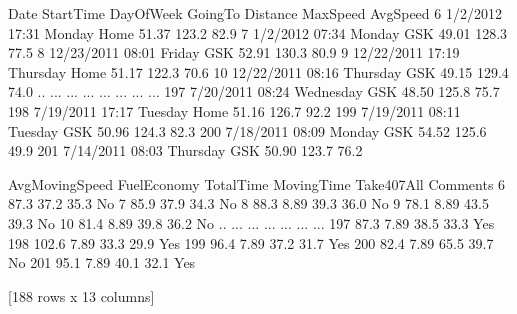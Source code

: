 \documentclass[letterpaper,10pt,english]{jupyterBook}
\begin{document}
\begin{sphinxVerbatim}[commandchars=\\\{\}]
           Date StartTime  DayOfWeek GoingTo  Distance  MaxSpeed  AvgSpeed  \PYGZbs{}
6      1/2/2012     17:31     Monday    Home     51.37     123.2      82.9   
7      1/2/2012     07:34     Monday     GSK     49.01     128.3      77.5   
8    12/23/2011     08:01     Friday     GSK     52.91     130.3      80.9   
9    12/22/2011     17:19   Thursday    Home     51.17     122.3      70.6   
10   12/22/2011     08:16   Thursday     GSK     49.15     129.4      74.0   
..          ...       ...        ...     ...       ...       ...       ...   
197   7/20/2011     08:24  Wednesday     GSK     48.50     125.8      75.7   
198   7/19/2011     17:17    Tuesday    Home     51.16     126.7      92.2   
199   7/19/2011     08:11    Tuesday     GSK     50.96     124.3      82.3   
200   7/18/2011     08:09     Monday     GSK     54.52     125.6      49.9   
201   7/14/2011     08:03   Thursday     GSK     50.90     123.7      76.2   

     AvgMovingSpeed FuelEconomy  TotalTime  MovingTime Take407All Comments  
6              87.3           \PYGZhy{}       37.2        35.3         No           
7              85.9           \PYGZhy{}       37.9        34.3         No           
8              88.3        8.89       39.3        36.0         No           
9              78.1        8.89       43.5        39.3         No           
10             81.4        8.89       39.8        36.2         No           
..              ...         ...        ...         ...        ...      ...  
197            87.3        7.89       38.5        33.3        Yes           
198           102.6        7.89       33.3        29.9        Yes           
199            96.4        7.89       37.2        31.7        Yes           
200            82.4        7.89       65.5        39.7         No           
201            95.1        7.89       40.1        32.1        Yes           

[188 rows x 13 columns]
\end{sphinxVerbatim}

\begin{sphinxVerbatim}[commandchars=\\\{\}]
\end{sphinxVerbatim}
\end{document}
